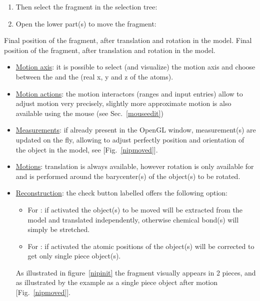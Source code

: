 \begin{enumerate}
\newpage
\item Then select the fragment in the selection tree: 
\begin{center}\end{center}
\item Open the lower part(s) to move the fragment:
\begin{center}\end{center}
\end{enumerate}
{Final position of the fragment, after translation and rotation in the model.}
{Final position of the fragment, after translation and rotation in the model.}
\begin{itemize}
\item \uline{Motion axis}: it is possible to select (and visualize) the motion axis and choose between the  and the  (real x, y and z of the atoms).
\item \uline{Motion actions}: the motion interactors (ranges and input entries) allow to adjust motion very precisely, slightly more approximate motion is also available using the mouse (see Sec.~\ref{mouseedit})
\item \uline{Measurements}: if already present in the OpenGL window, measurement(s) are updated on the fly, allowing to adjust perfectly position and orientation 
of the object in the model, see [Fig.~\ref{nipmoved}].
\item \uline{Motions}: translation is always available, however rotation is only available for  and is performed around the barycenter(s)
of the object(s) to be rotated.
\item \uline{Reconstruction}: the check button labelled  offers 
the following option:
\begin{itemize}
\item For : if activated the object(s) to be moved will be extracted from the model and translated independently, otherwise chemical bond(s) will simply be stretched. 
\item For : if activated the atomic positions of the object(s) will be corrected to get only single piece object(s). 
\end{itemize}
\newpage
As illustrated in figure~\ref{nipinit} the fragment visually appears in 2 pieces, and as illustrated by the example as a single piece object after motion [Fig.~\ref{nipmoved}]. \\

\end{itemize}
